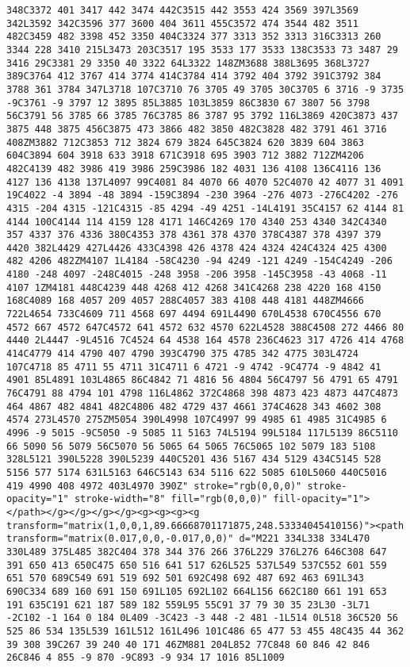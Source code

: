 \documentclass[
]{article}
\begin{document}
\begin{verbatim}
348C3372 401 3417 442 3474 442C3515 442 3553 424 3569 397L3569 342L3592 342C3596 377 3600 404 3611 455C3572 474 3544 482 3511 482C3459 482 3398 452 3350 404C3324 377 3313 352 3313 316C3313 260 3344 228 3410 215L3473 203C3517 195 3533 177 3533 138C3533 73 3487 29 3416 29C3381 29 3350 40 3322 64L3322 148ZM3688 388L3695 368L3727 389C3764 412 3767 414 3774 414C3784 414 3792 404 3792 391C3792 384 3788 361 3784 347L3718 107C3710 76 3705 49 3705 30C3705 6 3716 -9 3735 -9C3761 -9 3797 12 3895 85L3885 103L3859 86C3830 67 3807 56 3798 56C3791 56 3785 66 3785 76C3785 86 3787 95 3792 116L3869 420C3873 437 3875 448 3875 456C3875 473 3866 482 3850 482C3828 482 3791 461 3716 408ZM3882 712C3853 712 3824 679 3824 645C3824 620 3839 604 3863 604C3894 604 3918 633 3918 671C3918 695 3903 712 3882 712ZM4206 482C4139 482 3986 419 3986 259C3986 182 4031 136 4108 136C4116 136 4127 136 4138 137L4097 99C4081 84 4070 66 4070 52C4070 42 4077 31 4091 19C4022 -4 3894 -48 3894 -159C3894 -230 3964 -276 4073 -276C4202 -276 4315 -204 4315 -121C4315 -85 4294 -49 4251 -14L4191 35C4157 62 4144 81 4144 100C4144 114 4159 128 4171 146C4269 170 4340 253 4340 342C4340 357 4337 376 4336 380C4353 378 4361 378 4370 378C4387 378 4397 379 4420 382L4429 427L4426 433C4398 426 4378 424 4324 424C4324 425 4300 482 4206 482ZM4107 1L4184 -58C4230 -94 4249 -121 4249 -154C4249 -206 4180 -248 4097 -248C4015 -248 3958 -206 3958 -145C3958 -43 4068 -11 4107 1ZM4181 448C4239 448 4268 412 4268 341C4268 238 4220 168 4150 168C4089 168 4057 209 4057 288C4057 383 4108 448 4181 448ZM4666 722L4654 733C4609 711 4568 697 4494 691L4490 670L4538 670C4556 670 4572 667 4572 647C4572 641 4572 632 4570 622L4528 388C4508 272 4466 80 4440 2L4447 -9L4516 7C4524 64 4538 164 4578 236C4623 317 4726 414 4768 414C4779 414 4790 407 4790 393C4790 375 4785 342 4775 303L4724 107C4718 85 4711 55 4711 31C4711 6 4721 -9 4742 -9C4774 -9 4842 41 4901 85L4891 103L4865 86C4842 71 4816 56 4804 56C4797 56 4791 65 4791 76C4791 88 4794 101 4798 116L4862 372C4868 398 4873 423 4873 447C4873 464 4867 482 4841 482C4806 482 4729 437 4661 374C4628 343 4602 308 4574 273L4570 275ZM5054 390L4998 107C4997 99 4985 61 4985 31C4985 6 4996 -9 5015 -9C5050 -9 5085 11 5163 74L5194 99L5184 117L5139 86C5110 66 5090 56 5079 56C5070 56 5065 64 5065 76C5065 102 5079 183 5108 328L5121 390L5228 390L5239 440C5201 436 5167 434 5129 434C5145 528 5156 577 5174 631L5163 646C5143 634 5116 622 5085 610L5060 440C5016 419 4990 408 4972 403L4970 390Z" stroke="rgb(0,0,0)" stroke-opacity="1" stroke-width="8" fill="rgb(0,0,0)" fill-opacity="1"></path></g></g></g></g><g><g><g><g transform="matrix(1,0,0,1,89.66668701171875,248.53334045410156)"><path transform="matrix(0.017,0,0,-0.017,0,0)" d="M221 334L338 334L470 330L489 375L485 382C404 378 344 376 266 376L229 376L276 646C308 647 391 650 413 650C475 650 516 641 517 626L525 537L549 537C552 601 559 651 570 689C549 691 519 692 501 692C498 692 487 692 463 691L343 690C334 689 160 691 150 691L105 692L102 664L156 662C180 661 191 653 191 635C191 621 187 589 182 559L95 55C91 37 79 30 35 23L30 -3L71 -2C102 -1 164 0 184 0L409 -3C423 -3 448 -2 481 -1L514 0L518 36C520 56 525 86 534 135L539 161L512 161L496 101C486 65 477 53 455 48C435 44 362 39 308 39C267 39 240 40 171 46ZM881 204L852 77C848 60 846 42 846 26C846 4 855 -9 870 -9C893 -9 934 17 1016 85L1009 
\end{verbatim}
\end{document}
